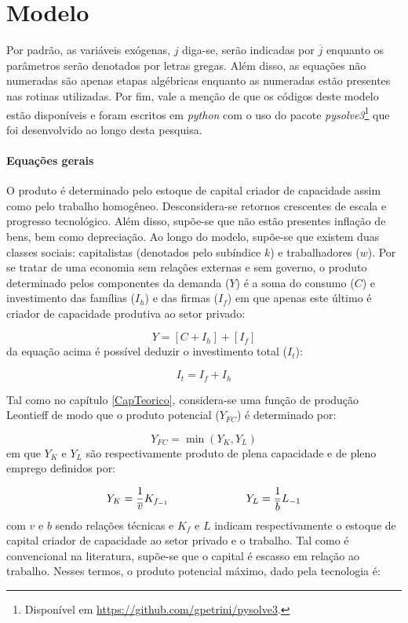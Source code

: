\section{Modelo}
\label{SecModelo}

Por padrão, as variáveis exógenas, $j$ diga-se, serão indicadas por $\overline{j}$ enquanto os parâmetros serão denotados por letras gregas. Além disso, as equações não numeradas são apenas etapas algébricas enquanto as numeradas estão presentes nas rotinas utilizadas. Por fim, vale a menção de que os códigos deste modelo estão disponíveis e foram escritos em \textit{python} com o uso do pacote \textit{pysolve3}\footnote{
	Disponível em \url{https://github.com/gpetrini/pysolve3}.
} que foi desenvolvido ao longo desta pesquisa.

\paragraph*{Equações gerais}

O produto é determinado pelo estoque de capital criador de capacidade assim como pelo trabalho homogêneo. Desconsidera-se retornos crescentes de escala e progresso tecnológico.
Além disso, supõe-se que não estão presentes inflação de bens, bem como depreciação.  
Ao longo do modelo, supõe-se que existem duas classes sociais: capitalistas (denotados pelo subíndice $k$) e trabalhadores ($w$).
Por se tratar de uma economia sem relações externas e sem governo, o produto determinado pelos componentes da demanda ($Y$) é a soma do consumo ($C$) e investimento das famílias ($I_h$) e das firmas ($I_f$) em que apenas este último é criador de capacidade produtiva ao setor privado:

\begin{equation}
\label{_Y}
    Y = [C + I_h] + [I_f]
\end{equation}
da equação acima é possível deduzir o investimento total ($I_t$):

\begin{equation}
\label{_It}
    I_t = I_f + I_h
\end{equation}

Tal como no capítulo \ref{CapTeorico}, considera-se uma função de produção Leontieff de modo que o produto potencial ($Y_{FC}$) é determinado por:

$$
Y_{FC} = \min (Y_K, Y_L)
$$
em que $Y_K$ e $Y_L$ são respectivamente produto de plena capacidade e de pleno emprego definidos por:

$$
Y_K = \frac{1}{\overline v}K_{f_{-1}} \hspace{2.5cm} Y_L = \frac{1}{\overline b}L_{-1}
$$
com $v$ e $b$ sendo relações técnicas e $K_f$ e $L$ indicam respectivamente o estoque de capital criador de capacidade ao setor privado e  o trabalho. Tal como é convencional na literatura, supõe-se que o capital é escasso em relação ao trabalho. Nesses termos, o produto potencial máximo, dado pela tecnologia é:

